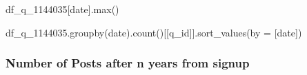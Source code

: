 \documentclass[
  letterpaper,
  DIV=11,
  numbers=noendperiod]{scrartcl}
\newenvironment{Shaded}{\begin{snugshade}}{\end{snugshade}}
\newcommand{\BuiltInTok}[1]{\textcolor[rgb]{0.00,0.23,0.31}{#1}}
\newcommand{\NormalTok}[1]{\textcolor[rgb]{0.00,0.23,0.31}{#1}}
\newcommand{\OperatorTok}[1]{\textcolor[rgb]{0.37,0.37,0.37}{#1}}
\newcommand{\StringTok}[1]{\textcolor[rgb]{0.13,0.47,0.30}{#1}}
\begin{document}
\begin{Shaded}
\begin{Highlighting}[]
\NormalTok{df\_q\_1144035[}\StringTok{\textquotesingle{}date\textquotesingle{}}\NormalTok{].}\BuiltInTok{max}\NormalTok{()}
\end{Highlighting}
\end{Shaded}

\begin{Shaded}
\begin{Highlighting}[]
\NormalTok{df\_q\_1144035.groupby(}\StringTok{\textquotesingle{}date\textquotesingle{}}\NormalTok{).count()[[}\StringTok{\textquotesingle{}q\_id\textquotesingle{}}\NormalTok{]].sort\_values(by }\OperatorTok{=}\NormalTok{ [}\StringTok{\textquotesingle{}date\textquotesingle{}}\NormalTok{])}
\end{Highlighting}
\end{Shaded}

\subsubsection{Number of Posts after n years from
signup}\label{number-of-posts-after-n-years-from-signup}
\end{document}

